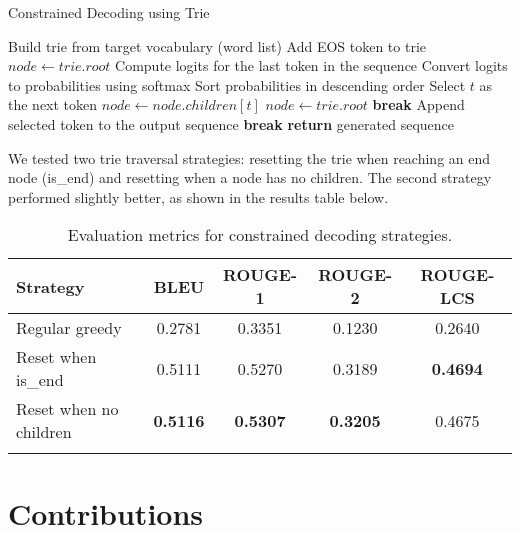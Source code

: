 \documentclass[11pt]{article}
\begin{document}
\begin{algorithm}
\caption{Constrained Decoding using Trie}
\begin{algorithmic}[1]
\State Build trie from target vocabulary (word list)
\State Add EOS token to trie
\State $node \gets trie.root$
    \State Compute logits for the last token in the sequence
    \State Convert logits to probabilities using softmax
    \State Sort probabilities in descending order
            \State Select $t$ as the next token
            \State $node \gets node.children[t]$
             
                        \State $node \gets trie.root$ 
                    \EndIf
            \State \textbf{break}
        \EndIf
    \EndFor
    \State Append selected token to the output sequence
        \State \textbf{break}
    \EndIf
\EndFor
\State \textbf{return} generated sequence
\end{algorithmic}
\end{algorithm}

We tested two trie traversal strategies: resetting the trie when reaching an end node (is\_end) and resetting when a node has no children. The second strategy performed slightly better, as shown in the results table below.

\begin{longtable}{|l|c|c|c|c|}
    \hline
    \textbf{Strategy} & \textbf{BLEU} & \textbf{ROUGE-1} & \textbf{ROUGE-2} & \textbf{ROUGE-LCS} \\
    \hline
    Regular greedy & 0.2781 & 0.3351 & 0.1230 & 0.2640 \\
    \hline
    Reset when is\_end & 0.5111 & 0.5270 & 0.3189 & \textbf{0.4694} \\
    \hline
    Reset when no children & \textbf{0.5116} & \textbf{0.5307} & \textbf{0.3205} & 0.4675 \\
    \hline
    \caption{Evaluation metrics for constrained decoding strategies.}
\end{longtable}



\section*{Contributions}
\end{document}
